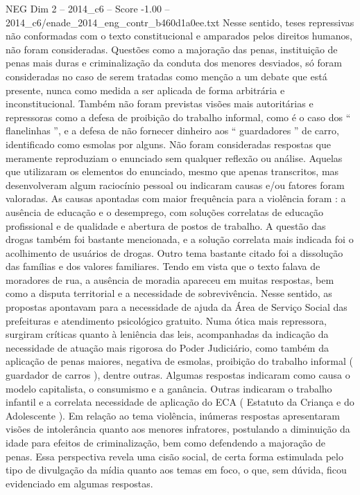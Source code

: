\begin{textsample}{NEG Dim 2 – 2014\_c6 – Score -1.00 – 2014\_c6/enade\_2014\_eng\_contr\_b460d1a0ee.txt}
Nesse sentido, teses repressivas não conformadas com o texto constitucional e amparados pelos direitos humanos, não foram consideradas.
Questões como a majoração das penas, instituição de penas mais duras e criminalização da conduta dos menores desviados, só foram consideradas no caso de serem tratadas como menção a um debate que está presente, nunca como medida a ser aplicada de forma arbitrária e inconstitucional.
Também não foram previstas visões mais autoritárias e repressoras como a defesa de proibição do trabalho informal, como é o caso dos “ flanelinhas ”, e a defesa de não fornecer dinheiro aos “ guardadores ” de carro, identificado como esmolas por alguns.
Não foram consideradas respostas que meramente reproduziam o enunciado sem qualquer reflexão ou análise.
Aquelas que utilizaram os elementos do enunciado, mesmo que apenas transcritos, mas desenvolveram algum raciocínio pessoal ou indicaram causas e/ou fatores foram valoradas.
As causas apontadas com maior frequência para a violência foram : a ausência de educação e o desemprego, com soluções correlatas de educação profissional e de qualidade e abertura de postos de trabalho.
A questão das drogas também foi bastante mencionada, e a solução correlata mais indicada foi o acolhimento de usuários de drogas.
Outro tema bastante citado foi a dissolução das famílias e dos valores familiares.
Tendo em vista que o texto falava de moradores de rua, a ausência de moradia apareceu em muitas respostas, bem como a disputa territorial e a necessidade de sobrevivência.
Nesse sentido, as propostas apontavam para a necessidade de ajuda da Área de Serviço Social das prefeituras e atendimento psicológico gratuito.
Numa ótica mais repressora, surgiram críticas quanto à leniência das leis, acompanhadas da indicação da necessidade de atuação mais rigorosa do Poder Judiciário, como também da aplicação de penas maiores, negativa de esmolas, proibição do trabalho informal ( guardador de carros ), dentre outras.
Algumas respostas indicaram como causa o modelo capitalista, o consumismo e a ganância.
Outras indicaram o trabalho infantil e a correlata necessidade de aplicação do ECA ( Estatuto da Criança e do Adolescente ).
Em relação ao tema violência, inúmeras respostas apresentaram visões de intolerância quanto aos menores infratores, postulando a diminuição da idade para efeitos de criminalização, bem como defendendo a majoração de penas.
Essa perspectiva revela uma cisão social, de certa forma estimulada pelo tipo de divulgação da mídia quanto aos temas em foco, o que, sem dúvida, ficou evidenciado em algumas respostas.

\end{textsample}
